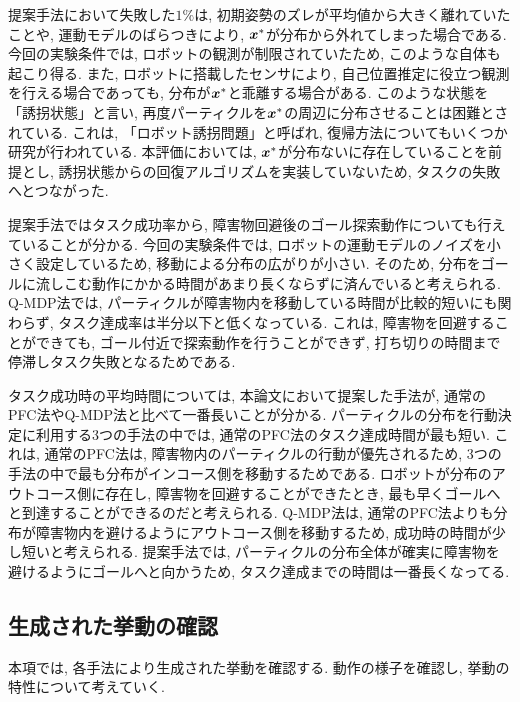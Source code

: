 提案手法において失敗した$1\%$は, 初期姿勢のズレが平均値から大きく離れていたことや, 運動モデルのばらつきにより, 
$\boldsymbol{x}^{*}$が分布から外れてしまった場合である. 
今回の実験条件では, ロボットの観測が制限されていたため, このような自体も起こり得る. 
また, ロボットに搭載したセンサにより, 自己位置推定に役立つ観測を行える場合であっても, 分布が$\boldsymbol{x}^{*}$と乖離する場合がある. 
このような状態を「誘拐状態」と言い, 再度パーティクルを$\boldsymbol{x}^{*}$の周辺に分布させることは困難とされている. 
これは, 「ロボット誘拐問題」と呼ばれ, 復帰方法についてもいくつか研究が行われている\cite{lenser2000etal}. 
本評価においては, $\boldsymbol{x}^{*}$が分布ないに存在していることを前提とし, 誘拐状態からの回復アルゴリズムを実装していないため, 
タスクの失敗へとつながった. 

提案手法ではタスク成功率から, 障害物回避後のゴール探索動作についても行えていることが分かる. 
今回の実験条件では, ロボットの運動モデルのノイズを小さく設定しているため, 移動による分布の広がりが小さい. 
そのため, 分布をゴールに流しこむ動作にかかる時間があまり長くならずに済んでいると考えられる. 
Q-MDP法では, パーティクルが障害物内を移動している時間が比較的短いにも関わらず, タスク達成率は半分以下と低くなっている. 
これは, 障害物を回避することができても, ゴール付近で探索動作を行うことができず, 打ち切りの時間まで停滞しタスク失敗となるためである. 

タスク成功時の平均時間については, 本論文において提案した手法が, 通常のPFC法やQ-MDP法と比べて一番長いことが分かる. 
パーティクルの分布を行動決定に利用する3つの手法の中では, 通常のPFC法のタスク達成時間が最も短い. 
これは, 通常のPFC法は, 障害物内のパーティクルの行動が優先されるため, 3つの手法の中で最も分布がインコース側を移動するためである. 
ロボットが分布のアウトコース側に存在し, 障害物を回避することができたとき, 最も早くゴールへと到達することができるのだと考えられる. 
Q-MDP法は, 通常のPFC法よりも分布が障害物内を避けるようにアウトコース側を移動するため, 成功時の時間が少し短いと考えられる. 
提案手法では, パーティクルの分布全体が確実に障害物を避けるようにゴールへと向かうため, タスク達成までの時間は一番長くなってる. 


\subsection{生成された挙動の確認}
本項では, 各手法により生成された挙動を確認する. 
動作の様子を確認し, 挙動の特性について考えていく. 


